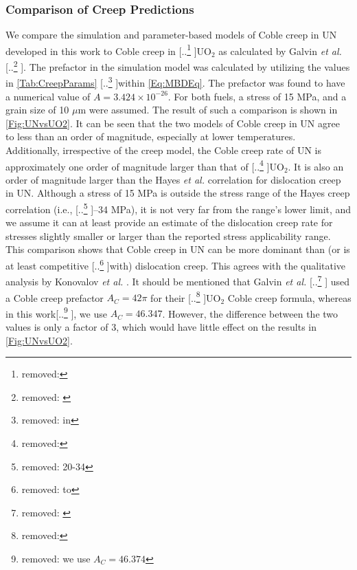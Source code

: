\documentclass[preprint,12pt,sort&compress]{elsarticle} %
\newcommand{\?}{\stackrel{?}{=}}
\providecommand{\DIFaddtex}[1]{{\sf #1}} %
\providecommand{\DIFdeltex}[1]{{[..\footnote{removed: #1} ]}} %
\providecommand{\DIFaddbegin}{\protect\color{blue}} %
\providecommand{\DIFaddend}{\protect\color{black}} %
\providecommand{\DIFdelbegin}{\protect\color{red}} %
\providecommand{\DIFdelend}{\protect\color{black}} %
\providecommand{\DIFadd}[1]{\texorpdfstring{\DIFaddtex{#1}}{#1}} %
\providecommand{\DIFdel}[1]{\texorpdfstring{\DIFdeltex{#1}}{}} %
\newcommand{\DIFscaledelfig}{0.5}
\newlength{\DIFdelgraphicswidth} %
\newlength{\DIFdelgraphicsheight} %
\newcommand{\DIFaddincludegraphics}[2][]{{\color{blue}\fbox{\DIFOincludegraphics[#1]{#2}}}} %
\newcommand{\DIFdelincludegraphics}[2][]{%
\sbox{\DIFdelgraphicsbox}{\DIFOincludegraphics[#1]{#2}}%
\settoboxwidth{\DIFdelgraphicswidth}{\DIFdelgraphicsbox} %
\settoboxtotalheight{\DIFdelgraphicsheight}{\DIFdelgraphicsbox} %
\scalebox{\DIFscaledelfig}{%
\parbox[b]{\DIFdelgraphicswidth}{\usebox{\DIFdelgraphicsbox}\\[-\baselineskip] \rule{\DIFdelgraphicswidth}{0em}}\llap{\resizebox{\DIFdelgraphicswidth}{\DIFdelgraphicsheight}{%
\setlength{\unitlength}{\DIFdelgraphicswidth}%
\begin{picture}(1,1)%
\thicklines\linethickness{2pt} %
{\color[rgb]{1,0,0}\put(0,0){\framebox(1,1){}}}%
{\color[rgb]{1,0,0}\put(0,0){\line( 1,1){1}}}%
{\color[rgb]{1,0,0}\put(0,1){\line(1,-1){1}}}%
\end{picture}%
}\hspace*{3pt}}} %
} %
\DeclareRobustCommand{\DIFaddbegin}{\DIFOaddbegin \let\includegraphics\DIFaddincludegraphics} %
\DeclareRobustCommand{\DIFaddend}{\DIFOaddend \let\includegraphics\DIFOincludegraphics} %
\DeclareRobustCommand{\DIFdelbegin}{\DIFOdelbegin \let\includegraphics\DIFdelincludegraphics} %
\DeclareRobustCommand{\DIFdelend}{\DIFOaddend \let\includegraphics\DIFOincludegraphics} %
\begin{document}
\subsubsection{Comparison of Creep Predictions}

We compare the simulation and parameter-based models of Coble creep in UN developed in this work to Coble creep in \DIFdelbegin \DIFdel{ }\DIFdelend \DIFaddbegin \DIFadd{UO$_2$ }\DIFaddend as calculated by Galvin \textit{et al.} \DIFdelbegin \DIFdel{\cite{Galvin2024b}}\DIFdelend \DIFaddbegin \DIFadd{\cite{Galvin2025}}\DIFaddend . The prefactor in the simulation model was calculated by utilizing the values in \cref{Tab:CreepParams} \DIFdelbegin \DIFdel{in }\DIFdelend \DIFaddbegin \DIFadd{within }\DIFaddend \cref{Eq:MBDEq}. The prefactor was found to have a numerical value of $A = 3.424 \times 10^{-26}$. For both fuels, a stress of 15 MPa, and a grain size of 10 $\mu$m were assumed. The result of such a comparison is shown in \cref{Fig:UNvsUO2}. It can be seen that the two models of Coble creep in UN agree to less than an order of magnitude, especially at lower temperatures. Additionally, irrespective of the creep model, the Coble creep rate of UN is approximately one order of magnitude larger than that of \DIFdelbegin \DIFdel{}\DIFdelend \DIFaddbegin \DIFadd{UO$_2$}\DIFaddend . It is also an order of magnitude larger than the Hayes \textit{et al.} correlation for dislocation creep in UN. Although a stress of 15 MPa is outside the stress range of the Hayes creep correlation (i.e., \DIFdelbegin \DIFdel{20-34 }\DIFdelend \DIFaddbegin \DIFadd{20--34 }\DIFaddend MPa), it is not very far from the range's lower limit, and we assume it can at least provide an estimate of the dislocation creep rate for stresses slightly smaller or larger than the reported stress applicability range. This comparison shows that Coble creep in UN can be more dominant than (or is at least competitive \DIFdelbegin \DIFdel{to}\DIFdelend \DIFaddbegin \DIFadd{with}\DIFaddend ) dislocation creep. This agrees with the qualitative analysis by Konovalov \textit{et al.} \cite{Konovalov2016}. It should be mentioned that Galvin \textit{et al.} \DIFdelbegin \DIFdel{\cite{Galvin2024b} }\DIFdelend \DIFaddbegin \DIFadd{\cite{Galvin2025} }\DIFaddend used a Coble creep prefactor $A_C = 42 \pi$ for their \DIFdelbegin \DIFdel{ }\DIFdelend \DIFaddbegin \DIFadd{UO$_2$ }\DIFaddend Coble creep formula, whereas in this work\DIFdelbegin \DIFdel{we use $A_C = 46.374$}\DIFdelend \DIFaddbegin \DIFadd{, we use $A_C = 46.347$}\DIFaddend . However, the difference between the two values is only a factor of 3, which would have little effect on the results in \cref{Fig:UNvsUO2}.
\end{document}
